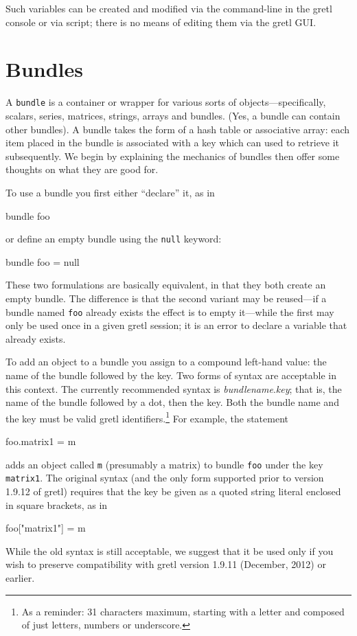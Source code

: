 Such variables can be created and modified via the command-line in
the gretl console or via script; there is no means of editing them
via the gretl GUI.


\section{Bundles}
\label{sec:Bundles}

A \texttt{bundle} is a container or wrapper for various sorts of
objects---specifically, scalars, series, matrices, strings, arrays and
bundles. (Yes, a bundle can contain other bundles). A bundle takes the
form of a hash table or associative array: each item placed in the
bundle is associated with a key which can used to retrieve it
subsequently. We begin by explaining the mechanics of bundles then
offer some thoughts on what they are good for.

To use a bundle you first either ``declare'' it, as in
%
\begin{code}
bundle foo
\end{code}
%
or define an empty bundle using the \texttt{null} keyword:
%
\begin{code}
bundle foo = null
\end{code}
%
These two formulations are basically equivalent, in that they both
create an empty bundle. The difference is that the second variant may
be reused---if a bundle named \texttt{foo} already exists the effect
is to empty it---while the first may only be used once in a given
gretl session; it is an error to declare a variable that already
exists.

To add an object to a bundle you assign to a compound left-hand value:
the name of the bundle followed by the key. Two forms of syntax are
acceptable in this context. The currently recommended syntax is
\textsl{bundlename}.\textsl{key}; that is, the name of the bundle
followed by a dot, then the key. Both the bundle name and the key must
be valid gretl identifiers.\footnote{As a reminder: 31 characters
  maximum, starting with a letter and composed of just letters,
  numbers or underscore.} For example, the statement
%
\begin{code}
foo.matrix1 = m
\end{code}
%
adds an object called \texttt{m} (presumably a matrix) to bundle
\texttt{foo} under the key \texttt{matrix1}. The original syntax (and
the only form supported prior to version 1.9.12 of gretl) requires
that the key be given as a quoted string literal enclosed in square
brackets, as in
%
\begin{code}
foo["matrix1"] = m
\end{code}
%
While the old syntax is still acceptable, we suggest that it be used
only if you wish to preserve compatibility with gretl version 1.9.11
(December, 2012) or earlier.

